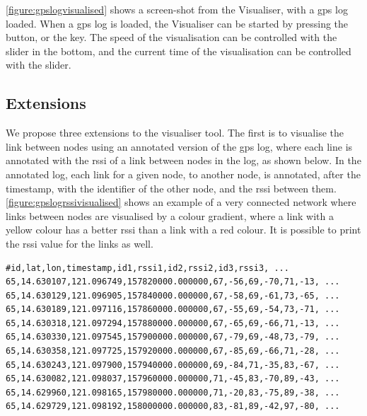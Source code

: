 \autoref{figure:gpslogvisualised} shows a screen-shot from the Visualiser, with a \acrshort{gps} log loaded.
When a \acrshort{gps} log is loaded, the Visualiser can be started by pressing the  button,
or the  key. The speed of the visualisation can be controlled with the 
slider in the bottom, and the current time of the visualisation can be controlled with the 
slider.

\subsection{Extensions}
We propose three extensions to the visualiser tool. The first is to visualise the link between nodes using an
annotated version of the \acrshort{gps} log, where each line is annotated with the \gls{rssi} of a link
between nodes in the log, as shown below. In the annotated log, each link for a given node, to another node,
is annotated, after the timestamp, with the identifier of the other node, and the \gls{rssi} between them.
\autoref{figure:gpslogrssivisualised} shows an example of a very connected
network where links between nodes are visualised by a colour gradient, where a link with a yellow colour has a
better \gls{rssi} than a link with a red colour. It is possible to print the \gls{rssi} value for the links as
well.
%
\begin{verbatim}
#id,lat,lon,timestamp,id1,rssi1,id2,rssi2,id3,rssi3, ...
65,14.630107,121.096749,157820000.000000,67,-56,69,-70,71,-13, ...
65,14.630129,121.096905,157840000.000000,67,-58,69,-61,73,-65, ...
65,14.630189,121.097116,157860000.000000,67,-55,69,-54,73,-71, ...
65,14.630318,121.097294,157880000.000000,67,-65,69,-66,71,-13, ...
65,14.630330,121.097545,157900000.000000,67,-79,69,-48,73,-79, ...
65,14.630358,121.097725,157920000.000000,67,-85,69,-66,71,-28, ...
65,14.630243,121.097900,157940000.000000,69,-84,71,-35,83,-67, ...
65,14.630082,121.098037,157960000.000000,71,-45,83,-70,89,-43, ...
65,14.629960,121.098165,157980000.000000,71,-20,83,-75,89,-38, ...
65,14.629729,121.098192,158000000.000000,83,-81,89,-42,97,-80, ...
\end{verbatim}

